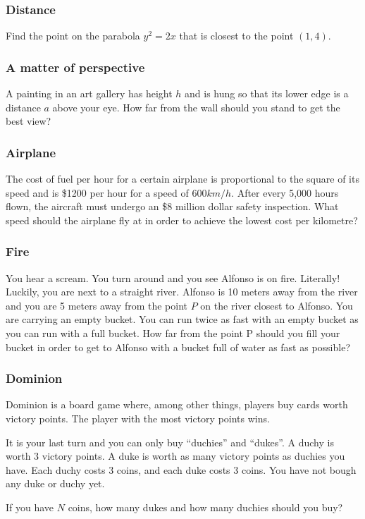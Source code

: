 \documentclass[14pt]{beamer}
\begin{document}
\begin{frame}[t]
	\frametitle{Distance}

	Find the point on the parabola $y^{2}=2x$ that is closest to the point $(1,4)$.
\end{frame}

\begin{frame}[t]
	\frametitle{A matter of perspective}

	A painting in an art gallery has height $h$ and is hung so that its lower edge
	is a distance $a$ above your eye. How far from the wall should you stand to get
	the best view?
\end{frame}

\begin{frame}[t]
	\frametitle{Airplane}

	The cost of fuel per hour for a certain airplane is proportional to the square
	of its speed and is \$1200 per hour for a speed of 600$km/h$. After every 5,000
	hours flown, the aircraft must undergo an \$8 million dollar safety inspection.
	What speed should the airplane fly at in order to achieve the lowest cost per
	kilometre?
\end{frame}

\begin{frame}[t]
	\frametitle{Fire}

	You hear a scream. You turn around and you see Alfonso is on fire. Literally! Luckily,
	you are next to a straight river. Alfonso is 10 meters away from the river and
	you are 5 meters away from the point $P$ on the river closest to Alfonso. You
	are carrying an empty bucket. You can run twice as fast with an empty bucket as
	you can run with a full bucket. How far from the point P should you fill your
	bucket in order to get to Alfonso with a bucket full of water as fast as
	possible?

\end{frame}

\begin{frame}[t]
	\frametitle{Dominion}

	Dominion is a board game where, among other things, players buy cards worth
	victory points. The player with the most victory points wins.

	It is your last turn and you can only buy ``duchies'' and ``dukes''. A duchy
	is worth 3 victory points. A duke is worth as many victory points as duchies you
	have. Each duchy costs 3 coins, and each duke costs 3 coins. You have not
	bough any duke or duchy yet.

	If you have $N$ coins, how many dukes and how many duchies should you buy?
\end{frame}
\end{document}
